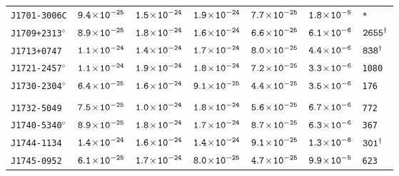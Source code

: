 \begin{longtable}{l | c | c | c | c | c | l}
\\[-20pt] 
\scriptsize{\tt{J1701-3006C}} & \scriptsize{$\tt{9.4\!\times\!10^{-25}}$} & \scriptsize{$\tt{1.5\!\times\!10^{-24}}$} & \scriptsize{$\tt{1.9\!\times\!10^{-24}}$} & \scriptsize{$\tt{7.7\!\times\!10^{-25}}$} & \scriptsize{$\tt{1.8\!\times\!10^{-5}}$} & \scriptsize{\tt{*}} \\[-16pt] 
\scriptsize{\tt{J1709+2313}$^{\diamond}$} & \scriptsize{$\tt{8.9\!\times\!10^{-25}}$} &
\scriptsize{$\tt{1.8\!\times\!10^{-24}}$} & \scriptsize{$\tt{1.6\!\times\!10^{-24}}$} & \scriptsize{$\tt{6.6\!\times\!10^{-25}}$}
& \scriptsize{$\tt{6.1\!\times\!10^{-6}}$} & \scriptsize{$\tt{2655^{\dagger}}$} \\[-16pt] 
\scriptsize{\tt{J1713+0747}} & \scriptsize{$\tt{1.1\!\times\!10^{-24}}$} & \scriptsize{$\tt{1.4\!\times\!10^{-24}}$} & \scriptsize{$\tt{1.7\!\times\!10^{-24}}$} & \scriptsize{$\tt{8.0\!\times\!10^{-25}}$} & \scriptsize{$\tt{4.4\!\times\!10^{-6}}$} & \scriptsize{$\tt{838^{\dagger}}$} \\[-16pt] 
\scriptsize{\tt{J1721-2457}$^{\diamond}$} & \scriptsize{$\tt{1.1\!\times\!10^{-24}}$} &
\scriptsize{$\tt{1.9\!\times\!10^{-24}}$} & \scriptsize{$\tt{1.8\!\times\!10^{-24}}$} &\scriptsize{$\tt{7.2\!\times\!10^{-25}}$} &
\scriptsize{$\tt{3.3\!\times\!10^{-6}}$} & \scriptsize{\tt{1080}} \\[-16pt] 
\scriptsize{\tt{J1730-2304}$^{\diamond}$} & \scriptsize{$\tt{6.4\!\times\!10^{-25}}$} &
\scriptsize{$\tt{1.6\!\times\!10^{-24}}$} & \scriptsize{$\tt{9.1\!\times\!10^{-25}}$} &\scriptsize{$\tt{4.4\!\times\!10^{-25}}$} &
\scriptsize{$\tt{3.5\!\times\!10^{-6}}$} & \scriptsize{\tt{176}} \\[-16pt] 
\\[-20pt] 
\scriptsize{\tt{J1732-5049}} & \scriptsize{$\tt{7.5\!\times\!10^{-25}}$} & \scriptsize{$\tt{1.0\!\times\!10^{-24}}$} & \scriptsize{$\tt{1.8\!\times\!10^{-24}}$} &\scriptsize{$\tt{5.6\!\times\!10^{-25}}$} & \scriptsize{$\tt{6.7\!\times\!10^{-6}}$} & \scriptsize{\tt{772}} \\[-16pt] 
\scriptsize{\tt{J1740-5340}$^{\diamond}$} & \scriptsize{$\tt{8.9\!\times\!10^{-25}}$} &
\scriptsize{$\tt{1.8\!\times\!10^{-24}}$} & \scriptsize{$\tt{1.7\!\times\!10^{-24}}$} &\scriptsize{$\tt{8.7\!\times\!10^{-25}}$} &
\scriptsize{$\tt{6.3\!\times\!10^{-6}}$} & \scriptsize{\tt{367}} \\[-16pt] 
\scriptsize{\tt{J1744-1134}} & \scriptsize{$\tt{1.4\!\times\!10^{-24}}$} & \scriptsize{$\tt{1.6\!\times\!10^{-24}}$} & \scriptsize{$\tt{1.4\!\times\!10^{-24}}$} & \scriptsize{$\tt{9.1\!\times\!10^{-25}}$} & \scriptsize{$\tt{1.3\!\times\!10^{-6}}$} & \scriptsize{$\tt{301^{\dagger}}$} \\[-16pt] 
\scriptsize{\tt{J1745-0952}} & \scriptsize{$\tt{6.1\!\times\!10^{-25}}$} & \scriptsize{$\tt{1.7\!\times\!10^{-24}}$} & \scriptsize{$\tt{8.0\!\times\!10^{-25}}$} &\scriptsize{$\tt{4.7\!\times\!10^{-25}}$} & \scriptsize{$\tt{9.9\!\times\!10^{-5}}$} & \scriptsize{\tt{623}} \\[-16pt] 

\end{longtable}

